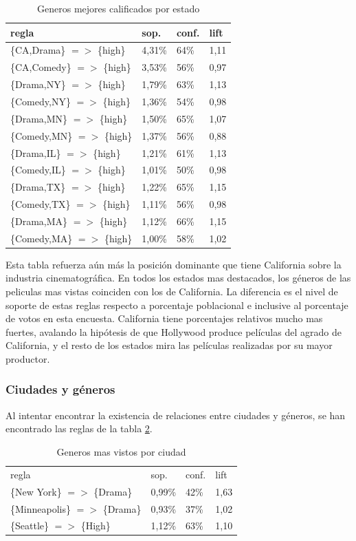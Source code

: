 \documentclass[journal]{IEEEtran}
\begin{document}
\begin{table}[ht!]
\caption{Generos mejores calificados por estado}
\label{table_genre_state_high}
\centering
\begin{tabular}{l l l l }
regla & sop. & conf. & lift \\
\hline
\{CA,Drama\} $=$$>$ \{high\} & 4,31\% & 64\% & 1,11 \\
\{CA,Comedy\} $=$$>$ \{high\} & 3,53\% & 56\% & 0,97 \\
\{Drama,NY\} $=$$>$ \{high\} & 1,79\% & 63\% &  1,13 \\
\{Comedy,NY\} $=$$>$ \{high\} & 1,36\% & 54\% &  0,98 \\
\{Drama,MN\} $=$$>$ \{high\} & 1,50\% & 65\% &  1,07 \\
\{Comedy,MN\} $=$$>$ \{high\} & 1,37\% & 56\% &  0,88 \\
\{Drama,IL\} $=$$>$ \{high\} & 1,21\% & 61\% & 1,13 \\
\{Comedy,IL\} $=$$>$ \{high\} & 1,01\% & 50\% & 0,98 \\
\{Drama,TX\} $=$$>$ \{high\} & 1,22\% & 65\% & 1,15 \\
\{Comedy,TX\} $=$$>$ \{high\} & 1,11\% & 56\% & 0,98 \\
\{Drama,MA\} $=$$>$ \{high\} & 1,12\% & 66\% & 1,15 \\
\{Comedy,MA\} $=$$>$ \{high\} & 1,00\% & 58\% & 1,02 \\
\end{tabular}
\end{table}

Esta tabla refuerza aún más la posición dominante que tiene California sobre la industria
cinematográfica. En todos los estados mas destacados, los géneros de 
las peliculas mas vistas coinciden con los de California. La diferencia es el nivel de
soporte de estas reglas respecto a porcentaje poblacional e inclusive al porcentaje de
votos en esta encuesta. California tiene porcentajes relativos mucho mas fuertes, avalando
la hipótesis de que Hollywood produce películas del agrado de California, y el resto de
los estados mira las películas realizadas por su mayor productor.


\subsubsection{Ciudades y géneros}
Al intentar encontrar la existencia de relaciones entre ciudades y géneros, se
han encontrado las reglas de la tabla \ref{citi_genre}.

\begin{table}[ht!]
\caption{Generos mas vistos por ciudad}
\label{citi_genre}
\centering
\begin{tabular}{l l l l }
regla & sop. & conf. & lift \\
\{New York\} $=$$>$ \{Drama\} & 0,99\% & 42\% & 1,63 \\
\{Minneapolis\} $=$$>$ \{Drama\} & 0,93\% & 37\% & 1,02 \\
\{Seattle\} $=$$>$ \{High\} & 1,12\% & 63\% & 1,10 \\
\end{tabular}
\end{table}
\end{document}
